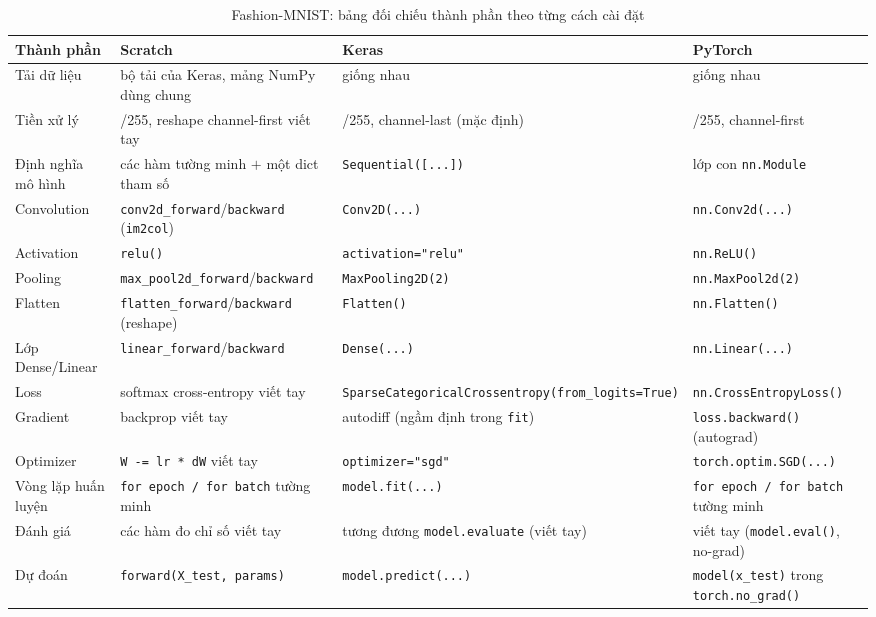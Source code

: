 \documentclass[11pt]{article}
\newcommand{\code}[1]{\texttt{#1}}
\begin{document}
\begin{table}[H]
\centering
\caption{Fashion-MNIST: bảng đối chiếu thành phần theo từng cách cài đặt}
\footnotesize
\begin{tabular}{@{}p{2.5cm}p{4.1cm}p{4.1cm}p{4.1cm}@{}}
\toprule
Thành phần & Scratch & Keras & PyTorch \\
\midrule
Tải dữ liệu & bộ tải của Keras, mảng NumPy dùng chung & giống nhau & giống nhau \\
Tiền xử lý & /255, reshape channel-first viết tay & /255, channel-last (mặc định) & /255, channel-first \\
Định nghĩa mô hình & các hàm tường minh $+$ một dict tham số & \code{Sequential([...])} & lớp con \code{nn.Module} \\
Convolution & \code{conv2d\_forward}/\code{backward} (\code{im2col}) & \code{Conv2D(...)} & \code{nn.Conv2d(...)} \\
Activation & \code{relu()} & \code{activation="relu"} & \code{nn.ReLU()} \\
Pooling & \code{max\_pool2d\_forward}/\code{backward} & \code{MaxPooling2D(2)} & \code{nn.MaxPool2d(2)} \\
Flatten & \code{flatten\_forward}/\code{backward} (reshape) & \code{Flatten()} & \code{nn.Flatten()} \\
Lớp Dense/Linear & \code{linear\_forward}/\code{backward} & \code{Dense(...)} & \code{nn.Linear(...)} \\
Loss & softmax cross-entropy viết tay & \code{SparseCategorical}\allowbreak\code{Crossentropy(}\allowbreak\code{from\_logits=True)} & \code{nn.CrossEntropyLoss()} \\
Gradient & backprop viết tay & autodiff (ngầm định trong \code{fit}) & \code{loss.backward()} (autograd) \\
Optimizer & \code{W -= lr * dW} viết tay & \code{optimizer="sgd"} & \code{torch.optim.SGD(...)} \\
Vòng lặp huấn luyện & \code{for epoch / for batch} tường minh & \code{model.fit(...)} & \code{for epoch / for batch} tường minh \\
Đánh giá & các hàm đo chỉ số viết tay & tương đương \code{model.evaluate} (viết tay) & viết tay (\code{model.eval()}, no-grad) \\
Dự đoán & \code{forward(X\_test, params)} & \code{model.predict(...)} & \code{model(x\_test)} trong \code{torch.no\_grad()} \\
\bottomrule
\end{tabular}
\end{table}
\end{document}
